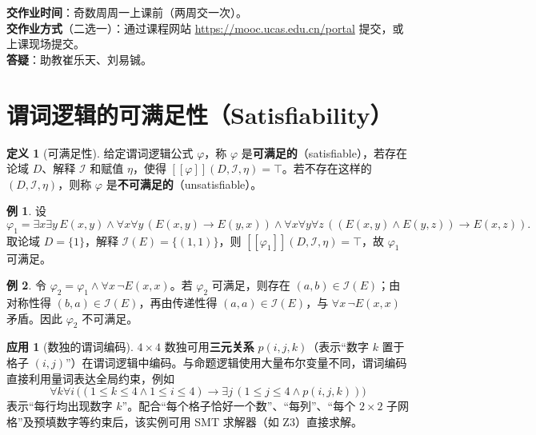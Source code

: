 \documentclass[UTF8,11pt,a4paper]{ctexbook}   %
\theoremstyle{definition}
\newtheorem{definition}{定义}[section]
\newtheorem{example}{例}[section]
\newtheorem{application}{应用}[section]
\begin{document}
\textbf{交作业时间}：奇数周周一上课前（两周交一次）。\\
\textbf{交作业方式}（二选一）：通过课程网站 \url{https://mooc.ucas.edu.cn/portal} 提交，或上课现场提交。\\
\textbf{答疑}：助教崔乐天、刘易铖。

\section{谓词逻辑的可满足性（Satisfiability）}

\begin{definition}[可满足性]
给定谓词逻辑公式 $\varphi$，称 $\varphi$ 是\textbf{可满足的}（satisfiable），若存在论域 $D$、解释 $\mathcal{I}$ 和赋值 $\eta$，使得 $[\![\varphi]\!](D,\mathcal{I},\eta)=\top$。若不存在这样的 $(D,\mathcal{I},\eta)$，则称 $\varphi$ 是\textbf{不可满足的}（unsatisfiable）。
\end{definition}

\begin{example}
设 
\[
\varphi_1=\exists x\exists y\,E(x,y)\land\forall x\forall y\,(E(x,y)\to E(y,x))\land\forall x\forall y\forall z\,((E(x,y)\land E(y,z))\to E(x,z)).
\]
取论域 $D=\{1\}$，解释 $\mathcal{I}(E)=\{(1,1)\}$，则 $[\![\varphi_1]\!](D,\mathcal{I},\eta)=\top$，故 $\varphi_1$ 可满足。
\end{example}

\begin{example}
令 $\varphi_2=\varphi_1\land\forall x\,\neg E(x,x)$。若 $\varphi_2$ 可满足，则存在 $(a,b)\in\mathcal{I}(E)$；由对称性得 $(b,a)\in\mathcal{I}(E)$，再由传递性得 $(a,a)\in\mathcal{I}(E)$，与 $\forall x\,\neg E(x,x)$ 矛盾。因此 $\varphi_2$ 不可满足。
\end{example}

\begin{application}[数独的谓词编码]
$4\times 4$ 数独可用\textbf{三元关系} $p(i,j,k)$（表示``数字 $k$ 置于格子 $(i,j)$''）在谓词逻辑中编码。与命题逻辑使用大量布尔变量不同，谓词编码直接利用量词表达全局约束，例如
\[
\forall k\forall i\,\bigl((1\le k\le 4\land 1\le i\le 4)\to\exists j\,(1\le j\le 4\land p(i,j,k))\bigr)
\]
表示``每行均出现数字 $k$''。配合``每个格子恰好一个数''、``每列''、``每个 $2\times 2$ 子网格''及预填数字等约束后，该实例可用 SMT 求解器（如 Z3）直接求解。
\end{application}

\end{document}
